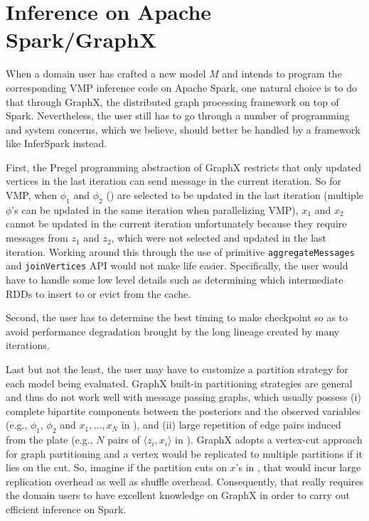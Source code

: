 \section{Inference on Apache Spark/GraphX}
When a domain user has crafted a new model $M$
and intends to program 
the corresponding VMP inference code on Apache Spark,
one natural choice is to do that through GraphX, the distributed graph processing framework on top of Spark.
Nevertheless, the user still has to go through a number of programming and system concerns,
which we believe, should better be handled by a framework like InferSpark instead.

First, 
the Pregel programming abstraction of GraphX
restricts that only updated vertices in the last iteration can send message in
the current iteration.
So for VMP,  
when $\phi_1$ and $\phi_2$ ()
are selected to be updated
in the last iteration (multiple $\phi$'s can be updated in the same iteration when parallelizing VMP), 
$x_1$ and $x_2$ 
cannot be updated in the current iteration unfortunately 
because they require messages from $z_1$ and $z_2$, which were not selected and updated in the last iteration.
Working around this 
through the use of primitive  \texttt{aggregateMessages} and \texttt{joinVertices} API
 would not make life easier.
 Specifically, the user would have to 
 handle some low level details such as determining which intermediate RDDs 
 to insert to or evict from the cache.
 

Second, the user has to determine the best timing to make checkpoint so as to
avoid performance degradation brought by the long lineage created by many iterations.


Last but not the least, the user may have to customize a partition strategy for
each model being evaluated. 
GraphX built-in partitioning strategies are general and thus do not work well with message passing graphs,
which usually 
possess (i) complete bipartite components between the posteriors and the  observed variables
(e.g., $\phi_1$, $\phi_2$ and $x_1, \ldots, x_N$ in ), and
(ii) large repetition of edge pairs induced from the plate (e.g.,  $N$ pairs of $\langle z_i, x_i\rangle$ in ).
GraphX adopts a vertex-cut approach for graph partitioning
and a vertex would be replicated to multiple partitions if it lies on the cut.
So, imagine if the partition cuts on $x$'s in , 
that would incur large replication overhead as well as shuffle overhead.
Consequently, that really requires the domain users 
to have excellent knowledge on GraphX in order to carry out efficient inference on Spark. 
